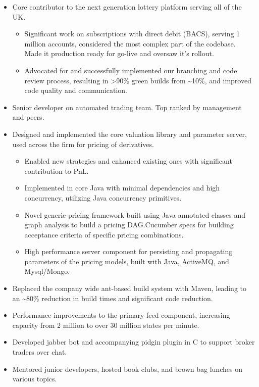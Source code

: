 \documentclass[11pt,a4paper,roman]{moderncv}
\begin{document}
\vspace{5mm}

\begin{itemize}
\item Core contributor to the next generation lottery platform serving all of the UK.\@
  \begin{itemize}
  \item Significant work on subscriptions with direct debit (BACS), serving 1 million accounts, considered the most complex part of the codebase. Made it production ready for go-live and oversaw it's rollout.
  \item Advocated for and successfully implemented our branching and code review process, resulting in >90\% green builds from \textasciitilde10\%, and improved code quality and communication.
  \end{itemize}
\end{itemize}

\vspace{5mm}

\clearpage
{}
\begin{itemize}
\item Senior developer on automated trading team. Top ranked by management and peers.
\item Designed and implemented the core valuation library and parameter server, used across the firm for pricing of derivatives.
  \begin{itemize}
  \item Enabled new strategies and enhanced existing ones with significant contribution to PnL.
  \item Implemented in core Java with minimal dependencies and high concurrency, utilizing Java concurrency primitives.
  \item Novel generic pricing framework built using Java annotated classes and graph analysis to build a pricing DAG.\@ Cucumber specs for building acceptance criteria of specific pricing combinations.
  \item High performance server component for persisting and propagating parameters of the pricing models, built with Java, ActiveMQ, and Mysql/Mongo.
  \end{itemize}
\item Replaced the company wide ant-based build system with Maven, leading to an \textasciitilde80\% reduction in build times and significant code reduction.
\item Performance improvements to the primary feed component, increasing capacity from 2 million to over 30 million states per minute.
\item Developed jabber bot and accompanying pidgin plugin in C to support broker traders over chat.
\item Mentored junior developers, hosted book clubs, and brown bag lunches on various topics.
\end{itemize}
\end{document}
